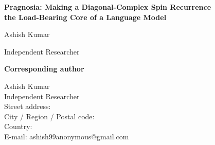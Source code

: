 \documentclass[12pt]{article}
\begin{document}
\begin{center}
{\Large\bfseries Pragnosia: Making a Diagonal-Complex Spin Recurrence\\[4pt]
the Load-Bearing Core of a Language Model}
\end{center}

\vspace{2.5em}

\begin{center}
{\large Ashish Kumar}
\end{center}

\vspace{0.5em}

\begin{center}
Independent Researcher
\end{center}

\vspace{3em}

\noindent\textbf{Corresponding author}

\vspace{0.5em}

\noindent Ashish Kumar\\
Independent Researcher\\
Street address: \underline{\hspace{7cm}}\\
City / Region / Postal code: \underline{\hspace{4.5cm}}\\
Country: \underline{\hspace{6cm}}\\[4pt]
E-mail: ashish99anonymous@gmail.com
\end{document}
